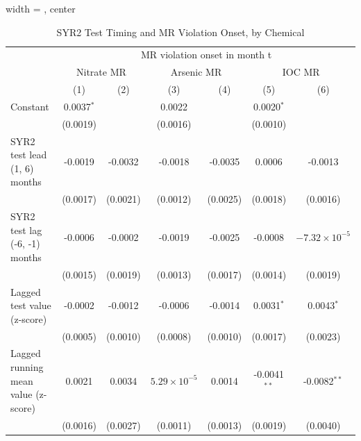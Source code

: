 
\begin{table}[htbp]
   
   \caption{\label{tab:syr2_test_mr_violation_bychem_iterative} SYR2 Test Timing and MR Violation Onset, by Chemical}
   \bigskip
   
   \centering
   
   \begin{adjustbox}{width = \textwidth, center}
      
      
      \begin{tabular}{lcccccc}
         \toprule
         
          & \multicolumn{6}{c}{MR violation onset in month t}\\
         
          & \multicolumn{2}{c}{Nitrate MR} & \multicolumn{2}{c}{Arsenic MR} & \multicolumn{2}{c}{IOC MR} \\ 
         
                                                & (1)          & (2)           & (3)                   & (4)           & (5)            & (6)\\  
         
         \midrule 
         Constant                               & 0.0037$^{*}$ &               & 0.0022                &               & 0.0020$^{*}$   &   \\   
                                                & (0.0019)     &               & (0.0016)              &               & (0.0010)       &   \\   
         SYR2 test lead (1, 6) months           & -0.0019      & -0.0032       & -0.0018               & -0.0035       & 0.0006         & -0.0013\\   
                                                & (0.0017)     & (0.0021)      & (0.0012)              & (0.0025)      & (0.0018)       & (0.0016)\\   
         SYR2 test lag (-6, -1) months          & -0.0006      & -0.0002       & -0.0019               & -0.0025       & -0.0008        & $-7.32\times 10^{-5}$\\    
                                                & (0.0015)     & (0.0019)      & (0.0013)              & (0.0017)      & (0.0014)       & (0.0019)\\   
         Lagged test value (z-score)            & -0.0002      & -0.0012       & -0.0006               & -0.0014       & 0.0031$^{*}$   & 0.0043$^{*}$\\   
                                                & (0.0005)     & (0.0010)      & (0.0008)              & (0.0010)      & (0.0017)       & (0.0023)\\   
         Lagged running mean value (z-score)    & 0.0021       & 0.0034        & $5.29\times 10^{-5}$  & 0.0014        & -0.0041$^{**}$ & -0.0082$^{**}$\\   
                                                & (0.0016)     & (0.0027)      & (0.0011)              & (0.0013)      & (0.0019)       & (0.0040)\\   
         

\end{tabular}
\end{adjustbox}
\end{table}
